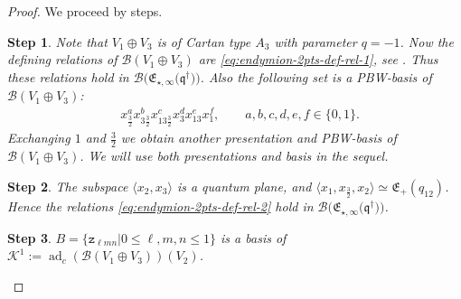 \documentclass[pdftex]{sigma}
\numberwithin{equation}{section}
\newtheorem{stepi}{Step}
\newcommand{\adc}{\operatorname{ad}_c}
\newcommand{\toba}{\mathscr B}
\newcommand{\K}{{\mathcal{K}}}
\newcommand{\zt}{\mathtt{z}}
\newcommand{\eny}{\mathfrak{E}}
\newcommand{\enyIIb}[1]{\eny_{\star,#1}}
\newcommand{\bq}{\mathfrak{q}}
\newcommand{\bqs}{\bq^{\dagger}}
\newcommand{\tresdos}{\frac{3}{2}}
\begin{document}
\begin{proof} We proceed by steps.
\begin{stepi}%
Note that $V_1\oplus V_3$ is of Cartan type $A_3$ with parameter $q= -1$. Now the defining relations of $\toba(V_1\oplus V_3)$
are \eqref{eq:endymion-2pts-def-rel-1}, see {\rm \cite{AA-diag-survey}}. Thus these relations hold in $\toba\big(\enyIIb{\infty}\big(\bqs\big)\big)$.
Also the following set is a PBW-basis of $\toba(V_1\oplus V_3)$:
\begin{align}\label{eq:Cartan-A3-PBWbasis}
& x_{\tresdos}^a x_{3\tresdos}^b x_{13\tresdos}^c x_3^d x_{13}^e x_1^f, \qquad a,b,c,d,e,f \in\{0,1\}.
\end{align}
Exchanging $1$ and $\tresdos$ we obtain another presentation and PBW-basis of $\toba(V_1\oplus V_3)$.
We will use both presentations and basis in the sequel.
\end{stepi}


\begin{stepi}%
The subspace $\langle x_2, x_3 \rangle$ is a quantum plane, and $\langle x_1,x_{\tresdos},x_2\rangle\simeq \eny_{+}(q_{12})$.
Hence the relations \eqref{eq:endymion-2pts-def-rel-2} hold in $\toba\big(\enyIIb{\infty}\big(\bqs\big)\big)$.
\end{stepi}

\begin{stepi}
$B = \{ \zt_{\ell mn} | 0\le \ell,m,n\leq 1 \}$ is a basis of $\K^1 :=\adc(\toba(V_1\oplus V_3))(V_2)$.
\end{stepi}


\end{proof}
\end{document}
